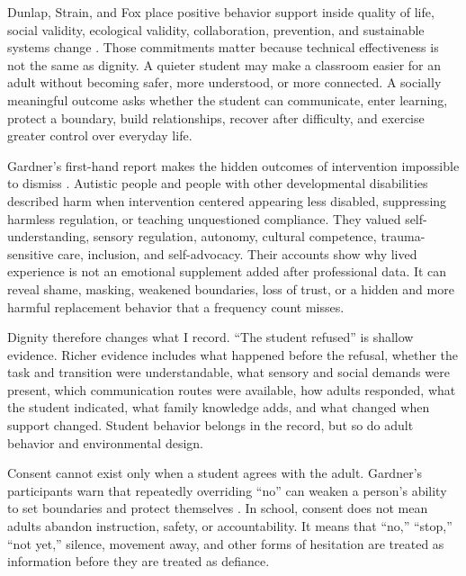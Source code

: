 
Dunlap, Strain, and Fox place positive behavior support inside quality of life, social validity, ecological validity, collaboration, prevention, and sustainable systems change \citep{dunlap2012pbs}. Those commitments matter because technical effectiveness is not the same as dignity. A quieter student may make a classroom easier for an adult without becoming safer, more understood, or more connected. A socially meaningful outcome asks whether the student can communicate, enter learning, protect a boundary, build relationships, recover after difficulty, and exercise greater control over everyday life.

Gardner's first-hand report makes the hidden outcomes of intervention impossible to dismiss \citep{gardner2017firsthand}. Autistic people and people with other developmental disabilities described harm when intervention centered appearing less disabled, suppressing harmless regulation, or teaching unquestioned compliance. They valued self-understanding, sensory regulation, autonomy, cultural competence, trauma-sensitive care, inclusion, and self-advocacy. Their accounts show why lived experience is not an emotional supplement added after professional data. It can reveal shame, masking, weakened boundaries, loss of trust, or a hidden and more harmful replacement behavior that a frequency count misses.

Dignity therefore changes what I record. ``The student refused'' is shallow evidence. Richer evidence includes what happened before the refusal, whether the task and transition were understandable, what sensory and social demands were present, which communication routes were available, how adults responded, what the student indicated, what family knowledge adds, and what changed when support changed. Student behavior belongs in the record, but so do adult behavior and environmental design.


Consent cannot exist only when a student agrees with the adult. Gardner's participants warn that repeatedly overriding ``no'' can weaken a person's ability to set boundaries and protect themselves \citep{gardner2017firsthand}. In school, consent does not mean adults abandon instruction, safety, or accountability. It means that ``no,'' ``stop,'' ``not yet,'' silence, movement away, and other forms of hesitation are treated as information before they are treated as defiance.

